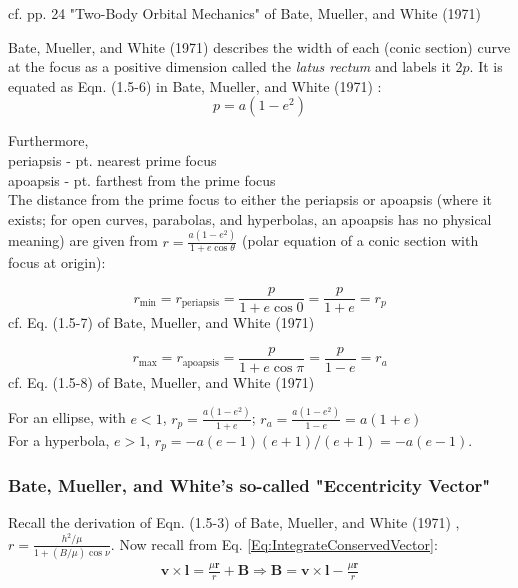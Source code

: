 \documentclass[10pt]{amsart}
\begin{document}
\begin{multicols*}{2}
cf. pp. 24 "Two-Body Orbital Mechanics" of Bate, Mueller, and White (1971) \cite{BMW1971}

Bate, Mueller, and White (1971) \cite{BMW1971} describes the width of each (conic section) curve at the focus as a positive dimension called the \emph{latus rectum} and labels it $2p$. It is equated as Eqn. (1.5-6) in  Bate, Mueller, and White (1971) \cite{BMW1971}:
\begin{equation}
	p = a(1-e^2)
\end{equation}

Furthermore, \\
periapsis - pt. nearest prime focus \\
apoapsis - pt. farthest from the prime focus \\

The distance from the prime focus to either the periapsis or apoapsis (where it exists; for open curves, parabolas, and hyperbolas, an apoapsis has no physical meaning) are given from $ r = \frac{ a(1-e^2) }{ 1 + e\cos{\theta} }$ (polar equation of a conic section with focus at origin):

\begin{equation}
	r_{\text{min}} = r_{\text{periapsis}} = \frac{p}{ 1 + e\cos{ 0 } } = \frac{p}{ 1 + e} = r_p
\end{equation} 
cf. Eq. (1.5-7) of Bate, Mueller, and White (1971) \cite{BMW1971}

\begin{equation}
	r_{\text{max}} = r_{\text{apoapsis}} = \frac{p}{ 1 + e\cos{\pi} } = \frac{p}{ 1 - e} = r_a
\end{equation} 
cf. Eq. (1.5-8) of Bate, Mueller, and White (1971) \cite{BMW1971}

For an ellipse, with $e<1$, $r_p = \frac{ a(1-e^2 )}{ 1 + e} $; $r_a = \frac{ a(1-e^2) }{ 1 - e} = a(1+e)$ \\

For a hyperbola, $e>1$, $r_p = -a (e-1) (e+1) / (e+1) = -a(e-1)$. \\

\subsubsection{Bate, Mueller, and White's so-called "Eccentricity Vector"}

Recall the derivation of Eqn. (1.5-3) of Bate, Mueller, and White (1971) \cite{BMW1971}, $r = \frac{h^2 / \mu}{ 1 + (B/\mu ) \cos{\nu} }$. Now recall from Eq. \ref{Eq:IntegrateConservedVector}:
\[
\begin{gathered}
	\mathbf{v} \times \mathbf{l} = \frac{\mu \mathbf{r}}{ r} + \mathbf{B} \Longrightarrow \mathbf{B} = \mathbf{v} \times \mathbf{l} - \frac{\mu \mathbf{r}}{r}
\end{gathered}
\]


\end{multicols*}
\end{document}
